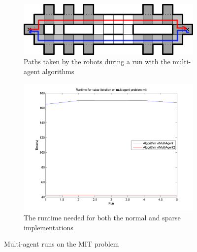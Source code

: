 \documentclass[10pt,a4paper]{article}
\begin{document}
\begin{figure}
        \centering
        \begin{subfigure}{0.4\textwidth}
                \includegraphics[width=\textwidth]{todo/mit/path-multi.png}
                \caption{Paths taken by the robots during a run with the multi-agent algorithms}
                \label{fig:multi_mit_part1}
                \hspace{10pt}
        \end{subfigure}
        \quad
        \begin{subfigure}{0.48\textwidth}
        		\includegraphics[width=\textwidth]{todo/mit/timings_vi.png}
                \caption{The runtime needed for both the normal and sparse implementations}
                \label{fig:multi_mit_part2}
                \hspace{-10pt}
        \end{subfigure}
        \caption{Multi-agent runs on the MIT problem}
        \label{fig:multi_mit}
\end{figure}
\end{document}

